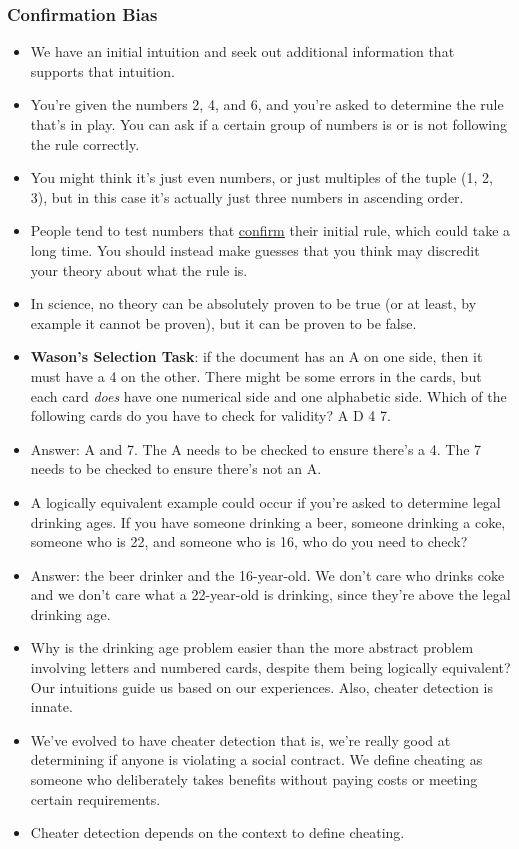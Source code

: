 \documentclass[]{article}
\begin{document}
			\subsubsection{Confirmation Bias}
				\begin{itemize}
					\item We have an initial intuition and seek out additional information that supports that intuition.
					\item You're given the numbers 2, 4, and 6, and you're asked to determine the rule that's in play. You can ask if a certain group of numbers is or is not following the rule correctly.
					\item You might think it's just even numbers, or just multiples of the tuple (1, 2, 3), but in this case it's actually just three numbers in ascending order.
					\item People tend to test numbers that \underline{confirm} their initial rule, which could take a long time. You should instead make guesses that you think may discredit your theory about what the rule is.
					\item In science, no theory can be absolutely proven to be true (or at least, by example it cannot be proven), but it can be proven to be false.
					\item \textbf{Wason's Selection Task}: if the document has an A on one side, then it must have a 4 on the other. There might be some errors in the cards, but each card \emph{does} have one numerical side and one alphabetic side. Which of the following cards do you have to check for validity? A D 4 7.
					\item Answer: A and 7. The A needs to be checked to ensure there's a 4. The 7 needs to be checked to ensure there's not an A.
					\item A logically equivalent example could occur if you're asked to determine legal drinking ages. If you have someone drinking a beer, someone drinking a coke, someone who is 22, and someone who is 16, who do you need to check? 
					\item Answer: the beer drinker and the 16-year-old. We don't care who drinks coke and we don't care what a 22-year-old is drinking, since they're above the legal drinking age.
					\item Why is the drinking age problem easier than the more abstract problem involving letters and numbered cards, despite them being logically equivalent? Our intuitions guide us based on our experiences. Also, cheater detection is innate.
					\item We've evolved to have cheater detection \textendash{} that is, we're really good at determining if anyone is violating a social contract. We define cheating as someone who deliberately takes benefits without paying costs or meeting certain requirements.
					\item Cheater detection depends on the context to define cheating.
				\end{itemize}
\end{document}
